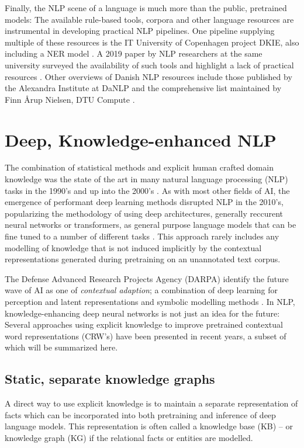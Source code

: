 \documentclass[main.tex]{subfiles}
\begin{document}
Finally, the NLP scene of a language is much more than the public, pretrained models:
The available rule-based tools, corpora and other language resources are instrumental in developing practical NLP pipelines.
One pipeline supplying multiple of these resources is the IT University of Copenhagen project DKIE, also including a NER model \cite{derc2014dkie}.
A 2019 paper by NLP researchers at the same university surveyed the availability of such tools and highlight a lack of practical resources \cite{kirkedal2019lacunae}.
Other overviews of Danish NLP resources include those published by the Alexandra Institute at DaNLP \cite{danlp2021} and the comprehensive list maintained by Finn Årup Nielsen, DTU Compute \cite{arup21awesome}.

\section{Deep, Knowledge-enhanced NLP}
The combination of statistical methods and explicit human crafted domain knowledge was the state of the art in many natural language processing (NLP) tasks in the 1990's and up into the 2000's \cite[Sec. 22.5]{russell2016ai}.
As with most other fields of AI, the emergence of performant deep learning methods disrupted NLP in the 2010's, popularizing the methodology of using deep architectures, generally reccurent neural networks or transformers, as general purpose language models that can be fine tuned to a number of different tasks \cite{otter18dlnlp}.
This approach rarely includes any modelling of knowledge that is not induced implicitly by the contextual representations generated during pretraining on an unannotated text corpus.

The Defense Advanced Research Projects Agency (DARPA) identify the future wave of AI as one of \emph{contextual adaption}; a combination of deep learning for perception and latent representations and symbolic modelling methods \cite{darpa17ai}.
In NLP, knowledge-enhancing deep neural networks is not just an idea for the future:
Several approaches using explicit knowledge to improve pretrained contextual word representations (CRW's) have been presented in recent years, a subset of which will be summarized here.

\subsection{Static, separate knowledge graphs}
A direct way to use explicit knowledge is to maintain a separate representation of facts which can be incorporated into both pretraining and inference of deep language models.
This representation is often called a knowledge base (KB)  -- or knowledge graph (KG) if the relational facts or entities are modelled.
\end{document}
